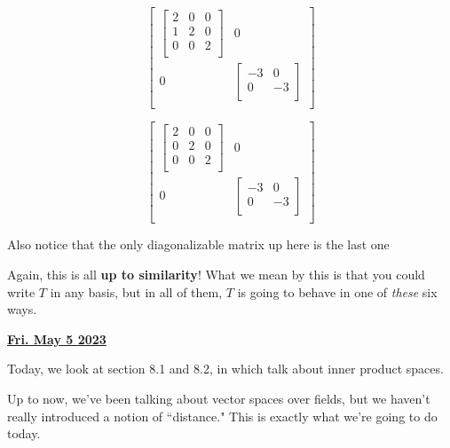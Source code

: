 \documentclass[12pt]{article}
\renewcommand{\date}[1]{\underline{\bf #1}}
\begin{document}
{\begin{multicols}{3}
      \[
        \begin{bmatrix}
          \begin{bmatrix}
            2 & 0 & 0\\
            1 & 2 & 0 \\
            0 & 0 & 2 \\
          \end{bmatrix} & 0 \\
          0 & \begin{bmatrix}
            -3 & 0 \\
            0 & -3 \\
          \end{bmatrix} \\
        \end{bmatrix}
      \]

      \[
        \begin{bmatrix}
          \begin{bmatrix}
            2 & 0 & 0\\
            0 & 2 & 0 \\
            0 & 0 & 2 \\
          \end{bmatrix} & 0 \\
          0 & \begin{bmatrix}
            -3 & 0 \\
            0 & -3 \\
          \end{bmatrix} \\
        \end{bmatrix}
      \]
    \end{multicols}

    Also notice that the only diagonalizable matrix up here is the last one

    Again, this is all {\bf up to similarity}! What we mean by this is that you
    could write $T$ in any basis, but in all of them, $T$ is going to behave in
    one of {\it these} six ways.
  }

  \date{Fri. May 5 2023}


  Today, we look at section 8.1 and 8.2, in which talk about inner product spaces.

  Up to now, we've been talking about vector spaces over fields, but we haven't
  really introduced a notion of ``distance." This is exactly what we're going to
  do today.
\end{document}
